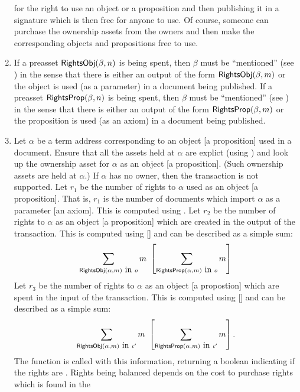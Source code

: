\begin{enumerate}
for the right to use an object or a proposition
and then publishing it in a signature which is then free for anyone to use.
Of course, someone can purchase the ownership assets from the owners
and then make the corresponding objects and propositions free to use.
\item {}
If a preasset ${\constr{RightsObj}}(\beta,n)$ is being spent, then 
$\beta$ must be ``mentioned'' (see {})
in the sense that there is either an output of the form
${\constr{RightsObj}}(\beta,m)$
or the object is used (as a parameter) in a document being published.
If a preasset ${\constr{RightsProp}}(\beta,n)$ is being spent, then 
$\beta$ must be ``mentioned'' (see {})
in the sense that there is either an output of the form
${\constr{RightsProp}}(\beta,m)$
or the proposition is used (as an axiom) in a document being published.
\item {}
Let $\alpha$ be a term address corresponding to an object [a proposition] used in a document.
Ensure that all the assets held at $\alpha$ are explict
(using {})
and look up the ownership asset for $\alpha$ as an object [a proposition].
(Such ownership assets are held at $\alpha$.)
If $\alpha$ has no owner, then the transaction is not supported.
Let $r_1$ be the number of rights to $\alpha$ used as an object [a proposition].
That is, $r_1$ is the number of documents which import $\alpha$ as a parameter [an axiom].
This is computed using {}.
Let $r_2$ be the number of rights to $\alpha$ as an object [a proposition]
which are created in the output of the transaction.
This is computed using {} [{}]
and can be described as a simple sum:
$$
\sum_{{\constr{RightsObj}(\alpha,m)} {\mbox{ in }} o} m
\,\,
\left[
\sum_{{\constr{RightsProp}(\alpha,m)} {\mbox{ in }} o} m
\right]
$$
Let $r_3$ be the number of rights to $\alpha$ as an object [a propostion]
which are spent in the input of the transaction.
This is computed using {} [{}]
and can be described as a simple sum:
$$
\sum_{{\constr{RightsObj}(\alpha,m)} {\mbox{ in }} \iota'} m
\,\,
\left[
\sum_{{\constr{RightsProp}(\alpha,m)} {\mbox{ in }} \iota'} m
\right].
$$
The function {} is called with this information,
returning a boolean indicating if the rights are {}.
Rights being balanced depends on the cost to purchase rights which is found in the

\end{enumerate}
